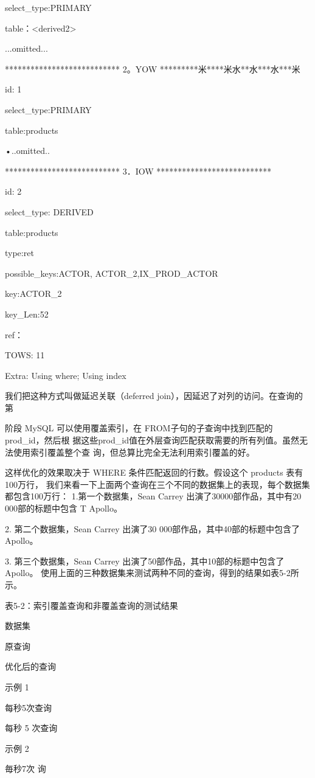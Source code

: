 select\_type:PRIMARY

table：<derived2>

...omitted...

*************************** 2。YOW *********米****米水**水***水***米

id: 1

select\_type:PRIMARY

table:products

•..omitted..

*************************** 3．IOW ***************************

id: 2

select\_type: DERIVED

table:products

type:ret

possible\_keys:ACTOR, ACTOR\_2,IX\_PROD\_ACTOR

key:ACTOR\_2

key\_Len:52

ref：

TOWS: 11

Extra: Using where; Using index

我们把这种方式叫做延迟关联（deferred join），因延迟了对列的访问。在查询的第

阶段 MySQL 可以使用覆盖索引，在 FROM子句的子查询中找到匹配的prod\_id，然后根
据这些prod\_id值在外层查询匹配获取需要的所有列值。虽然无法使用索引覆盖整个查
询，但总算比完全无法利用索引覆盖的好。

这样优化的效果取决于 WHERE 条件匹配返回的行数。假设这个 products 表有100万行，
我们来看一下上面两个查询在三个不同的数据集上的表现，每个数据集都包含100万行：
1.第一个数据集，Sean Carrey 出演了30000部作品，其中有20 000部的标题中包含
T Apollo。

2. 第二个数据集，Sean Carrey 出演了30 000部作品，其中40部的标题中包含了
Apollo。

3. 第三个数据集，Sean Carrey 出演了50部作品，其中10部的标题中包含了 Apollo。
使用上面的三种数据集来测试两种不同的查询，得到的结果如表5-2所示。

表5-2：索引覆盖查询和非覆盖查询的测试结果

数据集

原查询

优化后的查询

示例 1

每秒5次查询

每秒 5 次查询

示例 2

毎秒7次 询

